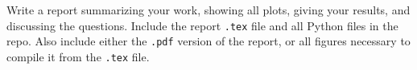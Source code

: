 \documentclass{article}
\begin{document}
Write a report summarizing your work, showing all plots, giving your results, and discussing the questions.  Include the report \texttt{.tex} file and all Python files in the repo.  Also include either the \texttt{.pdf} version of the report, or all figures necessary to compile it from the \texttt{.tex} file.
\end{document}
